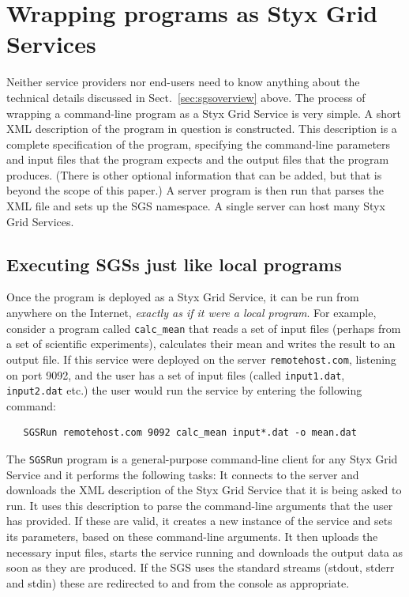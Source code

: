 \documentclass{llncs}
\begin{document}
\section{Wrapping programs as Styx Grid Services}\label{sec:wrapping}
Neither service providers nor end-users need to know anything about the technical details discussed in Sect.~\ref{sec:sgsoverview} above.  The process of wrapping a command-line program as a Styx Grid Service is very simple.  A short XML description of the program in question is constructed.  This description is a complete specification of the program, specifying the command-line parameters and input files that the program expects and the output files that the program produces.  (There is other optional information that can be added, but that is beyond the scope of this paper.)  A server program is then run that parses the XML file and sets up the SGS namespace.  A single server can host many Styx Grid Services.

\subsection{Executing SGSs just like local programs}

Once the program is deployed as a Styx Grid Service, it can be run from anywhere on the Internet, {\em exactly as if it were a local program\/}.  For example, consider a program called {\tt calc\_mean} that reads a set of input files (perhaps from a set of scientific experiments), calculates their mean and writes the result to an output file.  If this service were deployed on the server {\tt remotehost.com}, listening on port 9092, and the user has a set of input files (called {\tt input1.dat}, {\tt input2.dat} etc.) the user would run the service by entering the following command:

\begin{verbatim}
   SGSRun remotehost.com 9092 calc_mean input*.dat -o mean.dat
\end{verbatim}

The {\tt SGSRun} program is a general-purpose command-line client for any Styx Grid Service and it performs the following tasks:  It connects to the server and downloads the XML description of the Styx Grid Service that it is being asked to run.  It uses this description to parse the command-line arguments that the user has provided.  If these are valid, it creates a new instance of the service and sets its parameters, based on these command-line arguments.  It then uploads the necessary input files, starts the service running and downloads the output data as soon as they are produced.  If the SGS uses the standard streams (stdout, stderr and stdin) these are redirected to and from the console as appropriate.
\end{document}
